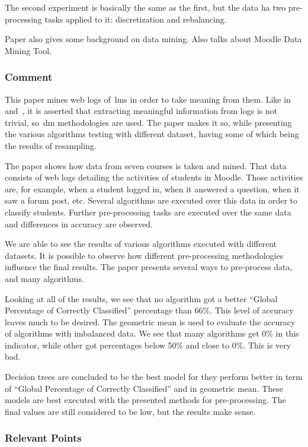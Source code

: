 The second experiment is basically the same as the first, but the data ha two
pre-processing tasks applied to it: discretization and rebalancing.

Paper also gives some background on data mining. Also talks about Moodle Data
Mining Tool.

\subsubsection{Comment}

This paper mines web logs of~\gls{lms} in order to take meaning from them. Like
in~\cite{ind_001} and~\cite{ind_002}, it is asserted that extracting meaningful
information from logs is not trivial, so~\gls{dm} methodologies are used. The
paper makes it so, while presenting the various algorithms testing with
different dataset, having some of which being the results of resampling.

The paper shows how data from seven courses is taken and mined. That data
consists of web logs detailing the activities of students in Moodle. Those
activities are, for example, when a student logged in, when it answered a
question, when it saw a forum post, etc. Several algorithms are executed over
this data in order to classify students. Further pre-processing tasks are
executed over the same data and differences in accuracy are observed.

We are able to see the results of various algorithms executed with different
datasets. It is possible to observe how different pre-processing methodologies
influence the final results. The paper presents several ways to pre-process
data, and many algorithms.

Looking at all of the results, we see that no algorithm got a better ``Global
Percentage of Correctly Classified'' percentage than 66\%. This level of
accuracy leaves much to be desired. The geometric mean is used to evaluate the
accuracy of algorithms with imbalanced data. We see that many algorithms get
0\% in this indicator, while other got percentages below 50\% and close to 0\%.
This is very bad.

Decision trees are concluded to be the best model for they perform better in
term of ``Global Percentage of Correctly Classified'' and in geometric mean.
These models are best executed with the presented methods for pre-processing.
The final values are still considered to be low, but the results make sense.

\subsubsection{Relevant Points}


